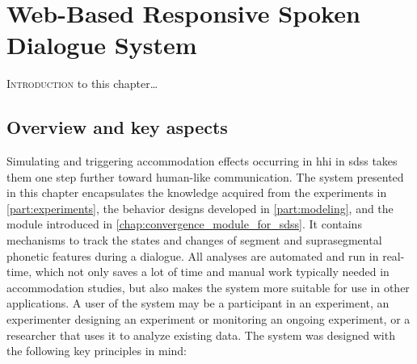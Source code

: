 \chapter{Web-Based Responsive Spoken Dialogue System}
\label{chap:web-based_responsive_spoken_dialogue_system}

\lettrine{I}{ntroduction} to this chapter\ldots

\pagebreak

\acresetall

\section[Overview]{Overview and key aspects}
\label{sec:overview_and_key_aspects}

Simulating and triggering accommodation effects occurring in \ac{hhi} in \acp{sds} takes them one step further toward human-like communication.
The system presented in this chapter encapsulates the knowledge acquired from the experiments in \cref{part:experiments}, the behavior designs developed in \cref{part:modeling}, and the module introduced in \cref{chap:convergence_module_for_sdss}.
It contains mechanisms to track the states and changes of segment and suprasegmental phonetic features during a dialogue.
All analyses are automated and run in real-time, which not only saves a lot of time and manual work typically needed in accommodation studies, but also makes the system more suitable for use in other applications.
A user of the system may be a participant in an experiment, an experimenter designing an experiment or monitoring an ongoing experiment, or a researcher that uses it to analyze existing data.
The system was designed with the following key principles in mind:
%
